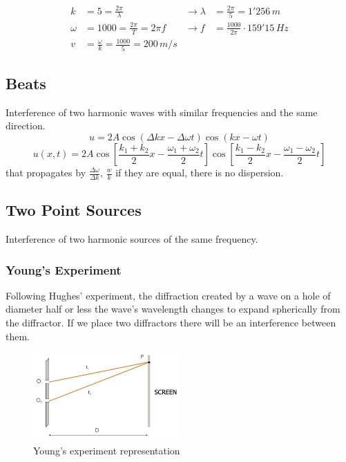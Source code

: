 \documentclass[a4paper]{article}
\begin{document}
\begin{align}
k & =5=\frac{2\pi}{\lambda} & \to\lambda & =\frac{2\pi}{5}=\boxed{1'256\,m} \\
\omega & =1000=\frac{2\pi}{T}=2\pi f & \to f & =\boxed{\frac{1000}{2\pi}\cdot 159'15\,Hz} \\
v & =\frac{\omega}{k}=\frac{1000}{5}=\boxed{200\,m / s}
\end{align}

\subsection{Beats}
\setcounter{equation}{0}
Interference of two harmonic waves with similar frequencies and the same direction.
$$
u=2A\cos(\Delta kx-\Delta \omega t)\cos(kx-\omega t)
$$
$$
u(x,t)=2A\cos\left[ \frac{k_{1}+k_{2}}{2}x-\frac{\omega_{1}+\omega_{2}}{2}t \right]\cos\left[ \frac{k_{1}-k_{2}}{2}x-\frac{\omega_{1}-\omega_{2}}{2}t \right]
$$
that propagates by $\frac{\Delta \omega}{\Delta k},\, \frac{w}{k}$ if they are equal, there is no dispersion.

\subsection{Two Point Sources}
\setcounter{equation}{0}
Interference of two harmonic sources of the same frequency.

\subsubsection{Young's Experiment}
\setcounter{equation}{0}
Following Hughes' experiment, the diffraction created by a wave on a hole of diameter half or less the wave's wavelength changes to expand spherically from the diffractor. If we place two diffractors there will be an interference between them.

\begin{figure}[H]
    \centering
    \includegraphics[width=0.5\textwidth]{IMG/young.png}
    \caption{Young's experiment representation}
    \label{fig:young}
\end{figure}
\end{document}
